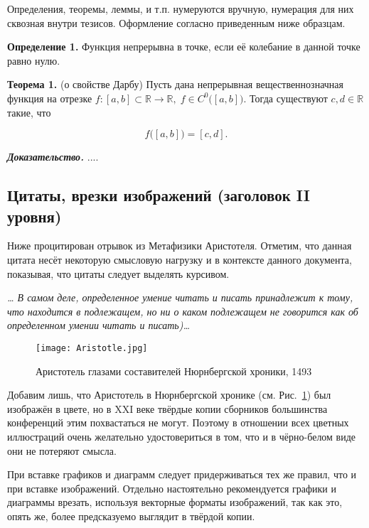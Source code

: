 \documentclass{math-mech-sci}
\begin{document}
Определения, теоремы, леммы, и т.п. нумеруются вручную, нумерация для них сквозная внутри тезисов. Оформление согласно приведенным ниже образцам.

\textbf{Определение 1.} Функция непрерывна в точке, если её колебание в данной точке равно нулю.

\textbf{Теорема 1.} (о свойстве Дарбу) Пусть дана непрерывная вещественнозначная функция на отрезке 
$f:[a,b]\subset \mathbb {R} \to \mathbb {R} ,\;f\in C^{0}{\bigl (}[a,b]{\bigr )}$. Тогда существуют
$ c,d\in \mathbb {R}$ такие, что

\begin{equation*}
	f{\bigl (}[a,b]{\bigr )}=[c,d].
\end{equation*}

\emph{\textbf{Доказательство.}} ....
	
	
\subsection*{Цитаты, врезки изображений (заголовок II уровня)}

Ниже процитирован отрывок из Метафизики Аристотеля. Отметим, что
данная цитата несёт некоторую смысловую нагрузку и в контексте данного
документа, показывая, что цитаты следует выделять курсивом.

\emph{\ldots{} В самом деле, определенное умение читать и писать
  принадлежит к тому, что находится в подлежащем, но ни о каком
  подлежащем не говорится как об определенном умении читать и
  писать)\ldots}

\begin{figure}[h]
\begin{center}
\texttt{[image: Aristotle.jpg]}
\end{center}
\caption{Аристотель глазами составителей Нюрнбергской хроники,
  1493}\label{fig:aristotle}
\end{figure}

Добавим лишь, что Аристотель в Нюрнбергской хронике
(см. Рис.~\ref{fig:aristotle}) был изображён в цвете, но в XXI веке
твёрдые копии сборников большинства конференций этим похвастаться не
могут. Поэтому в отношении всех цветных иллюстраций очень желательно
удостовериться в том, что и в чёрно-белом виде они не потеряют смысла.

При вставке графиков и диаграмм следует придерживаться тех же правил,
что и при вставке изображений. Отдельно настоятельно рекомендуется
графики и диаграммы врезать, используя векторные форматы изображений,
так как это, опять же, более предсказуемо выглядит в твёрдой копии.
\end{document}
